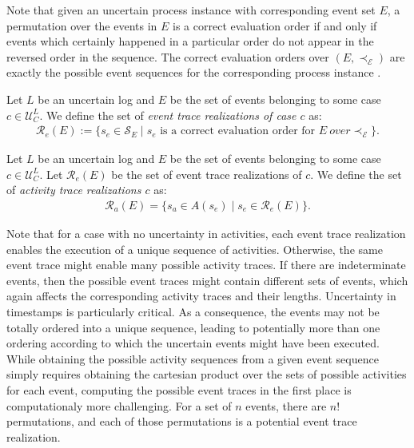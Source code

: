 Note that given an uncertain process instance with corresponding event set $E$, a permutation over the events in $E$ is a correct evaluation order if and only if events which certainly happened in a particular order do not appear in the reversed order in the sequence.
The correct evaluation orders over $(E,\prec_{\mathcal{E}})$ are exactly the possible event sequences for the corresponding process instance \cite{conformance}.

\begin{definition}\label{def: event trace realizations}
Let $L$ be an uncertain log and $E$ be the set of events belonging to some case $c \in \mathcal{U}_C^L$.
We define the set of \emph{event trace realizations of case $c$} as: 
\begin{align*}
\mathcal{R}_e(E) := \{
s_e \in \mathcal{S}_E \mid
s_e \text{ is a correct evaluation order for } E ~ over 
\prec_{\mathcal{E}}
\}.
\end{align*}
\end{definition}

\begin{definition}\label{def: activity trace realizations}
Let $L$ be an uncertain log and $E$ be the set of events belonging to some case $c \in \mathcal{U}_C^L$.
Let $\mathcal{R}_e(E)$ be the set of event trace realizations of $c$.
We define the set of \emph{activity trace realizations $c$} as: 
\begin{align*}
\mathcal{R}_a(E) = \{
 s_a \in A(s_e) \mid
s_e \in \mathcal{R}_e(E) 
 \}.
\end{align*}
\end{definition}


Note that for a case with no uncertainty in activities, each event trace realization enables the execution of a unique sequence of activities.
Otherwise, the same event trace might enable many possible activity traces.
If there are indeterminate events, then the possible event traces might contain different sets of events, which again affects the corresponding activity traces and their lengths.
Uncertainty in timestamps is particularly critical.
As a consequence, the events may not be totally ordered into a unique sequence, leading to potentially more than one ordering according to which the uncertain events might have been executed.
While obtaining the possible activity sequences from a given event sequence simply requires obtaining the cartesian product over the sets of  possible activities for each event, computing the possible event traces in the first place is computationaly more challenging.
For a set of $n$ events, there are $n!$ permutations, and each of those permutations is a potential event trace realization.

